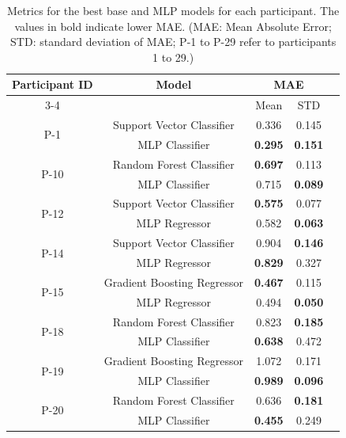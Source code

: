 \begin{table}[htbp]
 \caption{Metrics for the best base and MLP models for each participant. The values in bold indicate lower MAE. (MAE: Mean Absolute Error; STD: standard deviation of MAE; P-1 to P-29 refer to participants 1 to 29.)}
 \centering
 \begin{tabular}{ccc c c}
 \hline
 \multirow{2}{*}{Participant ID} & Model & \multicolumn{2}{c}{MAE} \\
 \cline{3-4}
 &  & Mean & STD \\
 \hline

 \multirow{2}{*}{P-1} 
 & Support Vector Classifier & 0.336 & 0.145 \\
 & MLP Classifier              & \textbf{0.295} & \textbf{0.151} \\
 \hline

 \multirow{2}{*}{P-10} 
 & Random Forest Classifier    & \textbf{0.697} & 0.113 \\
 & MLP Classifier              & 0.715 & \textbf{0.089} \\
 \hline

 \multirow{2}{*}{P-12} 
 & Support Vector Classifier   & \textbf{0.575} & 0.077 \\
 & MLP Regressor               & 0.582 & \textbf{0.063} \\
 \hline

 \multirow{2}{*}{P-14} 
 & Support Vector Classifier   & 0.904 & \textbf{0.146} \\
 & MLP Regressor               & \textbf{0.829} & 0.327 \\
 \hline

 \multirow{2}{*}{P-15} 
 & Gradient Boosting Regressor & \textbf{0.467} & 0.115 \\
 & MLP Regressor               & 0.494 & \textbf{0.050} \\
 \hline

 \multirow{2}{*}{P-18} 
 & Random Forest Classifier    & 0.823 & \textbf{0.185} \\
 & MLP Classifier              & \textbf{0.638} & 0.472 \\
 \hline

 \multirow{2}{*}{P-19} 
 & Gradient Boosting Regressor & 1.072 & 0.171 \\
 & MLP Classifier              & \textbf{0.989} & \textbf{0.096} \\
 \hline

 \multirow{2}{*}{P-20} 
 & Random Forest Classifier    & 0.636 & \textbf{0.181} \\
 & MLP Classifier              & \textbf{0.455} & 0.249 \\
 \hline


\end{tabular}
\end{table}
